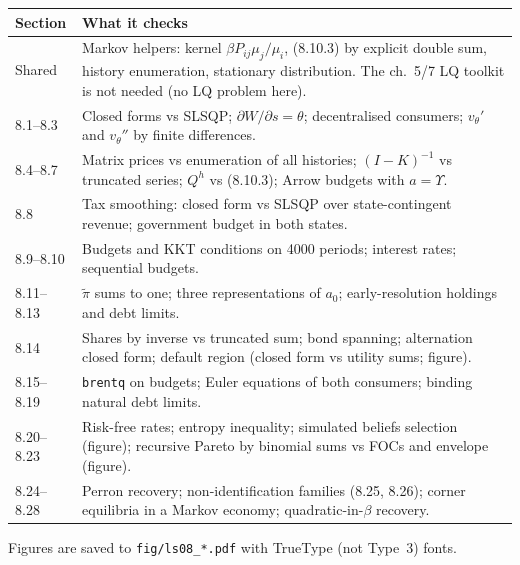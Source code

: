 \documentclass[12pt, letterpaper]{article}
\begin{document}
\begin{center}
\begin{tabular}{@{}lp{11.2cm}@{}}
\toprule
\textbf{Section} & \textbf{What it checks} \\
\midrule
Shared & Markov helpers: kernel $\beta P_{ij}\mu_j/\mu_i$, (8.10.3) by explicit double sum, history enumeration, stationary distribution. The ch.~5/7 LQ toolkit is not needed (no LQ problem here). \\
8.1--8.3 & Closed forms vs SLSQP; $\partial W/\partial s=\theta$; decentralised consumers; $v_\theta'$ and $v_\theta''$ by finite differences. \\
8.4--8.7 & Matrix prices vs enumeration of all histories; $(I-K)^{-1}$ vs truncated series; $Q^h$ vs (8.10.3); Arrow budgets with $a=\Upsilon$. \\
8.8 & Tax smoothing: closed form vs SLSQP over state-contingent revenue; government budget in both states. \\
8.9--8.10 & Budgets and KKT conditions on 4000 periods; interest rates; sequential budgets. \\
8.11--8.13 & $\tilde\pi$ sums to one; three representations of $a_0$; early-resolution holdings and debt limits. \\
8.14 & Shares by inverse vs truncated sum; bond spanning; alternation closed form; default region (closed form vs utility sums; figure). \\
8.15--8.19 & \texttt{brentq} on budgets; Euler equations of both consumers; binding natural debt limits. \\
8.20--8.23 & Risk-free rates; entropy inequality; simulated beliefs selection (figure); recursive Pareto by binomial sums vs FOCs and envelope (figure). \\
8.24--8.28 & Perron recovery; non-identification families (8.25, 8.26); corner equilibria in a Markov economy; quadratic-in-$\beta$ recovery. \\
\bottomrule
\end{tabular}
\end{center}

Figures are saved to \texttt{fig/ls08\_*.pdf} with TrueType (not Type~3) fonts.
\end{document}
